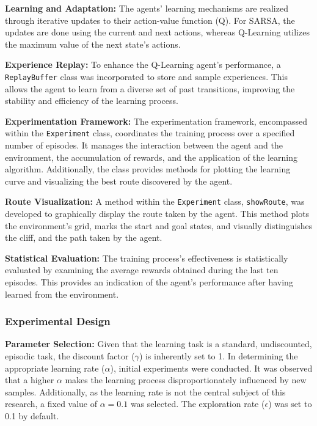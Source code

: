 \documentclass[12pt]{article}
\begin{document}
\textbf{Learning and Adaptation:}
The agents' learning mechanisms are realized through iterative updates to their action-value function (Q). For SARSA, the updates are done using the current and next actions, whereas Q-Learning utilizes the maximum value of the next state's actions. 

\textbf{Experience Replay:}
To enhance the Q-Learning agent's performance, a \texttt{ReplayBuffer} class was incorporated to store and sample experiences. This allows the agent to learn from a diverse set of past transitions, improving the stability and efficiency of the learning process.

\textbf{Experimentation Framework:}
The experimentation framework, encompassed within the \texttt{Experiment} class, coordinates the training process over a specified number of episodes. It manages the interaction between the agent and the environment, the accumulation of rewards, and the application of the learning algorithm. Additionally, the class provides methods for plotting the learning curve and visualizing the best route discovered by the agent.

\textbf{Route Visualization:}
A method within the \texttt{Experiment} class, \texttt{showRoute}, was developed to graphically display the route taken by the agent. This method plots the environment's grid, marks the start and goal states, and visually distinguishes the cliff, and the path taken by the agent.

\textbf{Statistical Evaluation:}
The training process's effectiveness is statistically evaluated by examining the average rewards obtained during the last ten episodes. This provides an indication of the agent's performance after having learned from the environment.
%
\subsubsection{Experimental Design}

\textbf{Parameter Selection:}
Given that the learning task is a standard, undiscounted, episodic task, the discount factor (\(\gamma\)) is inherently set to 1. In determining the appropriate learning rate (\(\alpha\)), initial experiments were conducted. It was observed that a higher \(\alpha\) makes the learning process disproportionately influenced by new samples. Additionally, as the learning rate is not the central subject of this research, a fixed value of \(\alpha = 0.1\) was selected. The exploration rate (\(\epsilon\)) was set to 0.1 by default.
\end{document}
